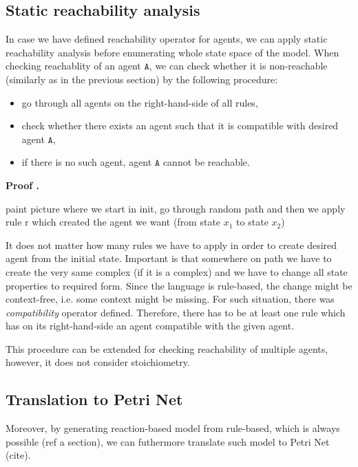 \documentclass[12pt]{fithesis2}
\newcounter{counter}[section]
\renewcommand{\thecounter}{\thesection.\arabic{counter}}
\newenvironment{proof}{\medskip\refstepcounter{counter}\textbf{Proof \thecounter}\par\nopagebreak\noindent}{\medskip}
\begin{document}
\subsection{Static reachability analysis}

In case we have defined reachability operator for agents, we can apply static reachability analysis before enumerating whole state space of the model. When checking reachablity of an agent $\mathtt{A}$, we can check whether it is non-reachable (similarly as in the previous section) by the following procedure:

\begin{itemize}
\item go through all agents on the right-hand-side of all rules,
\item check whether there exists an agent such that it is compatible with desired agent $\mathtt{A}$,
\item if there is no such agent, agent $\mathtt{A}$ cannot be reachable.
\end{itemize}

\begin{proof}
{paint picture where we start in init, go through random path and then we apply rule r which created the agent we want (from state $x_1$ to state $x_2$)

It does not matter how many rules we have to apply in order to create desired agent from the initial state. Important is that somewhere on path we have to create the very same complex (if it is a complex) and we have to change all state properties to required form. Since the language is rule-based, the change might be context-free, i.e. some context might be missing. For such situation, there was \emph{compatibility} operator defined. Therefore, there has to be at least one rule which has on its right-hand-side an agent compatible with the given agent.}
\end{proof}

This procedure can be extended for checking reachability of multiple agents, however, it does not consider stoichiometry.

\subsection{Translation to Petri Net}

Moreover, by generating reaction-based model from rule-based, which is always possible (ref a section), we can futhermore translate such model to Petri Net (cite).
\end{document}
